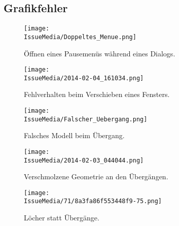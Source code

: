%



\clearpage


	
	
\subsection*{Grafikfehler}



%
%	
%	
%


\begin{figure}[ht]

	\centering
	\label{Anhang:Grafikfehler:Dialog_Pause}
	
	\texttt{[image: \\IssueMedia/Doppeltes\_Menue.png]}
	
	\caption{Öffnen eines Pausemenüs während eines Dialogs.}

\end{figure}

\begin{figure}[ht]

	\centering
	\label{Anhang:Grafikfehler:Fenster_Schieben}
	
	\texttt{[image: \\IssueMedia/2014-02-04\_161034.png]}
	
	\caption{Fehlverhalten beim Verschieben eines Fensters.}

\end{figure}



\clearpage



\begin{figure}[ht]

	\centering
	\label{Anhang:Grafikfehler:Falscher_Uebergang}
	
	\texttt{[image: \\IssueMedia/Falscher\_Uebergang.png]}
	
	\caption{Falsches Modell beim Übergang.}

\end{figure}


\begin{figure}[ht]

	\centering
	\label{Anhang:Grafikfehler:Ueberlappung_am_Uebergang}
	
	\texttt{[image: \\IssueMedia/2014-02-03\_044044.png]}
	
	\caption{Verschmolzene Geometrie an den Übergängen.}

\end{figure}



\clearpage



\begin{figure}[ht]

	\centering
	\label{Anhang:Grafikfehler:Loechrige_Uebergaenge}
	
	\texttt{[image: \\IssueMedia/71/8a3fa86f553448f9-75.png]}
	
	\caption{Löcher statt Übergänge.}

\end{figure}

